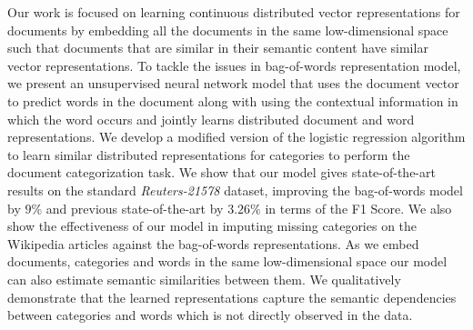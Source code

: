 Our work is focused on learning continuous distributed vector representations for documents by embedding all the documents in the same low-dimensional space such that documents that are similar in their semantic content have similar vector representations. To tackle the issues in bag-of-words representation model, we present an unsupervised neural network model that uses the document vector to predict words in the document along with using the contextual information in which the word occurs and jointly learns distributed document and word representations. We develop a modified version of the logistic regression algorithm to learn similar distributed representations for categories to perform the document categorization task. 
We show that our model gives state-of-the-art results on the standard \emph{Reuters-21578} dataset, improving the bag-of-words model by $9\%$ and previous state-of-the-art by $3.26\%$ in terms of the F1 Score. We also show the effectiveness of our model in imputing missing categories on the Wikipedia articles against the bag-of-words representations. 
As we embed documents, categories and words in the same low-dimensional space our model can also estimate semantic similarities between them. We qualitatively demonstrate that the learned representations capture the semantic dependencies between categories and words which is not directly observed in the data. 
